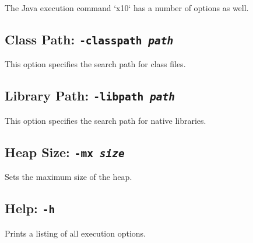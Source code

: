 The Java execution command \xcd`x10` has a number of options as well. 

\subsection{Class Path: {\tt -classpath {\em path}}}

This option specifies the search path for class files. 

\subsection{Library Path: {\tt -libpath {\em path}}}

This option specifies the search path for native libraries.

\subsection{Heap Size: {\tt -mx {\em size}}}

Sets the maximum size of the heap. 

\subsection{Help: {\tt -h}}

Prints a listing of all execution options.



